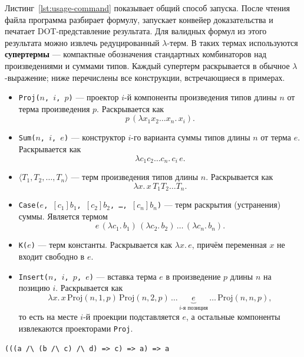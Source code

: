 \documentclass[14pt, russian]{scrartcl}
\begin{document}
Листинг~\ref{lst:usage-command} показывает общий способ запуска. После чтения
файла программа разбирает формулу, запускает конвейер доказательства и печатает
DOT-представление результата. Для валидных формул из этого результата можно
извлечь редуцированный $\lambda$-терм. В таких термах используются
\textbf{супертермы} --- компактные обозначения стандартных комбинаторов над
произведениями и суммами типов. Каждый супертерм раскрывается в обычное
$\lambda$-выражение; ниже перечислены все конструкции, встречающиеся в
примерах.
\begin{itemize}
\item \texttt{Proj($n$, $i$, $p$)} --- проектор $i$-й компоненты произведения
  типов длины $n$ от терма произведения $p$. Раскрывается как
  \[
    p\,(\lambda x_1 x_2 \ldots x_n.\, x_i).
  \]
\item \texttt{Sum($n$, $i$, $e$)} --- конструктор $i$-го варианта суммы типов
  длины $n$ от терма $e$. Раскрывается как
  \[
    \lambda c_1 c_2 \ldots c_n.\, c_i\, e.
  \]
\item $\langle T_1, T_2, \ldots, T_n \rangle$ --- терм произведения типов
  длины $n$. Раскрывается как
  \[
    \lambda x.\, x\, T_1 T_2 \ldots T_n.
  \]
\item \texttt{Case($e$, $[c_1]b_1$, $[c_2]b_2$, \ldots, $[c_n]b_n$)} --- терм
  раскрытия (устранения) суммы. Является термом
  \[
    e\,(\lambda c_1.\, b_1)\,(\lambda c_2.\, b_2)\,\ldots\,(\lambda c_n.\, b_n).
  \]
\item \texttt{K($e$)} --- терм константы. Раскрывается как $\lambda x.\, e$,
  причём переменная $x$ не входит свободно в $e$.
\item \texttt{Insert($n$, $i$, $p$, $e$)} --- вставка терма $e$ в произведение
  $p$ длины $n$ на позицию $i$. Раскрывается как
  \[
    \lambda x.\, x\,\mathrm{Proj}(n, 1, p)\,\mathrm{Proj}(n, 2, p)\,\ldots\,
    \underbrace{e}_{i\text{-я позиция}}\,\ldots\,\mathrm{Proj}(n, n, p),
  \]
  то есть на месте $i$-й проекции подставляется $e$, а остальные компоненты
  извлекаются проекторами \texttt{Proj}.
\end{itemize}

\begin{listing}[!htb]
\caption{Входная формула \texttt{complex-and-impl-chain.txt}}
\label{lst:usage-complex-and-impl-chain-input}
\begin{verbatim}
(((a /\ (b /\ c) /\ d) => c) => a) => a
\end{verbatim}
\end{listing}
\end{document}
